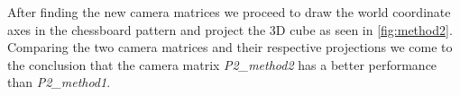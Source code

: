 After finding the new camera matrices we proceed to draw the world coordinate axes in the chessboard pattern and project the 3D cube as seen in \ref{fig:method2}.\newline
Comparing the two camera matrices and their respective projections we come to the conclusion that the camera matrix \textsl{P2\_method2} has a better performance than \textsl{P2\_method1}. 	


